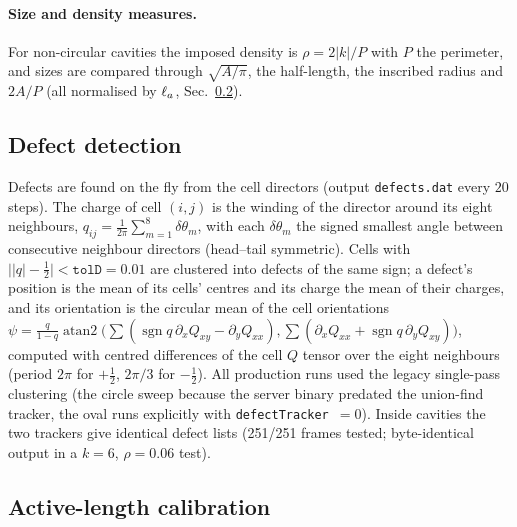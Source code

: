\paragraph{Size and density measures.} For non-circular cavities the imposed density is $\rho=2|k|/P$ with $P$ the
perimeter, and sizes are compared through $\sqrt{A/\pi}$, the half-length, the inscribed radius and $2A/P$
(all normalised by $\ell_a$, Sec.~\ref{sec:md-la}).

\subsection{Defect detection}
\label{sec:md-defects}

Defects are found on the fly from the cell directors (output \texttt{defects.dat} every $20$ steps).
The charge of cell $(i,j)$ is the winding of the director around its eight neighbours,
$q_{ij}=\frac1{2\pi}\sum_{m=1}^{8}\delta\theta_m$, with each $\delta\theta_m$ the signed smallest angle between
consecutive neighbour directors (head--tail symmetric). Cells with $\big||q|-\tfrac12\big|<\texttt{tolD}=0.01$
are clustered into defects of the same sign; a defect's position is the mean of its cells' centres and its
charge the mean of their charges, and its orientation is the circular mean of the cell orientations
$\psi=\frac{q}{1-q}\operatorname{atan2}\!\big(\sum(\operatorname{sgn}q\,\partial_xQ_{xy}-\partial_yQ_{xx}),
\sum(\partial_xQ_{xx}+\operatorname{sgn}q\,\partial_yQ_{xy})\big)$, computed with centred differences of the
cell $Q$ tensor over the eight neighbours (period $2\pi$ for $+\tfrac12$, $2\pi/3$ for $-\tfrac12$).
All production runs used the legacy single-pass clustering (the circle sweep because the server binary predated the
union-find tracker, the oval runs explicitly with \texttt{defectTracker}~$=0$). Inside cavities the two trackers give
identical defect lists (251/251 frames tested; byte-identical output in a $k=6$, $\rho=0.06$ test).

\subsection{Active-length calibration}
\label{sec:md-la}

